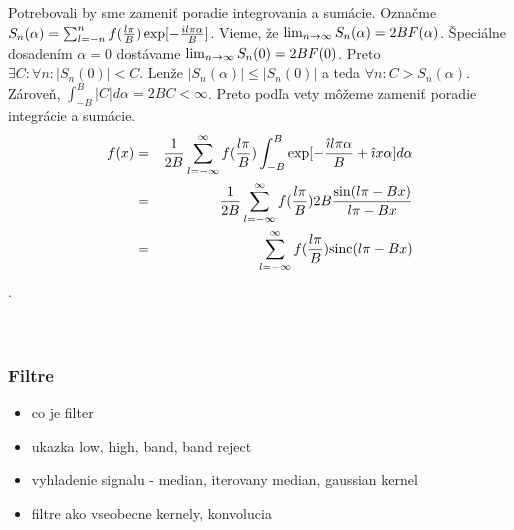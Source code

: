 \begin{dokaz}
    Potrebovali by sme zameniť poradie integrovania a sumácie.
    Označme $S_n(\alpha) = \sum_{l=-n}^{n} f(\frac{l \pi}{B})
    \exp[-\frac{\hat{\imath} l \pi \alpha}{B}]$.
    Vieme, že $\lim_{n\rightarrow \infty} S_n(\alpha) = 2 B F(\alpha)$.
    Špeciálne dosadením $\alpha=0$ dostávame
     $\lim_{n \rightarrow \infty} S_n(0) = 2 B F(0)$.
     Preto $\exists C: \forall n: |S_n(0)| < C$.
     Lenže $|S_n(\alpha)| \le |S_n(0)|$ a teda $\forall n: C >
     S_n(\alpha)$.
     Zároveň, $\int_{-B}^B |C| d\alpha = 2 B C < \infty$.
     Preto podľa vety 
     môžeme zameniť poradie integrácie a sumácie.     
    \begin{eqnarray}
       f(x) & = & \frac{1}{2B}  \sum_{l=-\infty}^{\infty} 
                f(\frac{l \pi}{B}) \int_{-B}^{B} 
                \exp[-\frac{\hat{\imath} l \pi \alpha}{B}
                + \hat{\imath} x \alpha] d\alpha \\
            & = & \frac{1}{2B} \sum_{l=-\infty}^{\infty}
                f(\frac{l \pi}{B}) 2B \frac{\sin(l \pi - B x)}{l \pi -
                B x} \\
            & = & \sum_{l=-\infty}^{\infty}
                f(\frac{l \pi}{B})  {\rm sinc}(l \pi - B x)
    \end{eqnarray}
    . \\
    \todo{} \\
    \todo{} \\
    \todo{}
\end{dokaz}


\subsubsection{Filtre}

\begin{itemize}
    \item co je filter
    \item ukazka low, high, band, band reject
    \item vyhladenie signalu - median, iterovany median, gaussian
    kernel
    \item filtre ako vseobecne kernely, konvolucia
\end{itemize}
